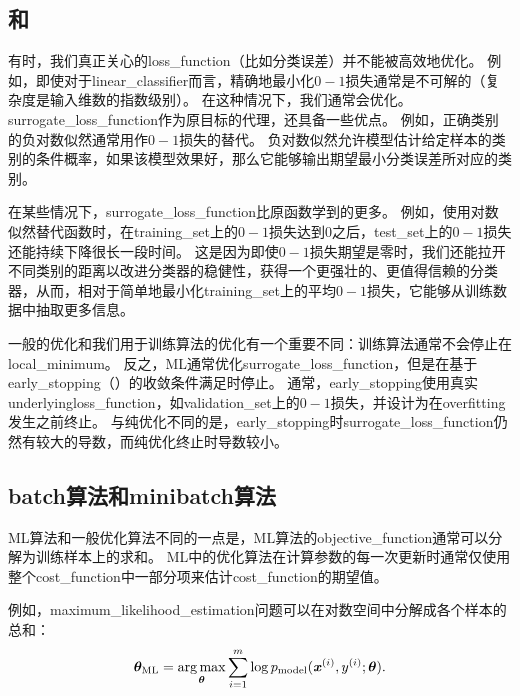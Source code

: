 \subsection{和}
\label{sec:surrogate_loss_functions_and_early_stopping}
有时，我们真正关心的\gls{loss_function}（比如分类误差）并不能被高效地优化。
例如，即使对于\gls{linear_classifier}而言，精确地最小化$0-1$损失通常是不可解的（复杂度是输入维数的指数级别）\citep{Marcotte-92}。
在这种情况下，我们通常会优化。
\gls{surrogate_loss_function}作为原目标的代理，还具备一些优点。  
例如，正确类别的负对数似然通常用作$0-1$损失的替代。
负对数似然允许模型估计给定样本的类别的条件概率，如果该模型效果好，那么它能够输出期望最小分类误差所对应的类别。


在某些情况下，\gls{surrogate_loss_function}比原函数学到的更多。
例如，使用对数似然替代函数时，在\gls{training_set}上的$0-1$损失达到$0$之后，\gls{test_set}上的$0-1$损失还能持续下降很长一段时间。
这是因为即使$0-1$损失期望是零时，我们还能拉开不同类别的距离以改进分类器的稳健性，获得一个更强壮的、更值得信赖的分类器，从而，相对于简单地最小化\gls{training_set}上的平均$0-1$损失，它能够从训练数据中抽取更多信息。


一般的优化和我们用于训练算法的优化有一个重要不同：训练算法通常不会停止在\gls{local_minimum}。
反之，\gls{ML}通常优化\gls{surrogate_loss_function}，但是在基于\gls{early_stopping}（）的收敛条件满足时停止。
通常，\gls{early_stopping}使用真实\gls{underlying}\gls{loss_function}，如\gls{validation_set}上的$0-1$损失，并设计为在\gls{overfitting}发生之前终止。
与纯优化不同的是，\gls{early_stopping}时\gls{surrogate_loss_function}仍然有较大的导数，而纯优化终止时导数较小。


\subsection{\gls{batch}算法和\gls{minibatch}算法}
\label{sec:batch_and_minibatch_algorithms}
\gls{ML}算法和一般优化算法不同的一点是，\gls{ML}算法的\gls{objective_function}通常可以分解为训练样本上的求和。
\gls{ML}中的优化算法在计算参数的每一次更新时通常仅使用整个\gls{cost_function}中一部分项来估计\gls{cost_function}的期望值。

例如，\gls{maximum_likelihood_estimation}问题可以在对数空间中分解成各个样本的总和：
\begin{equation}
\label{eq:8.4}
    \boldsymbol{\theta}_{\text{ML}} = \underset{\boldsymbol{\theta}}{\arg\max} \sum_{i=1}^m
    \log p_{\text{model}} (\boldsymbol{\mathit{x}}^{(i)}, y^{(i)}; \boldsymbol{\theta}) .
\end{equation}


